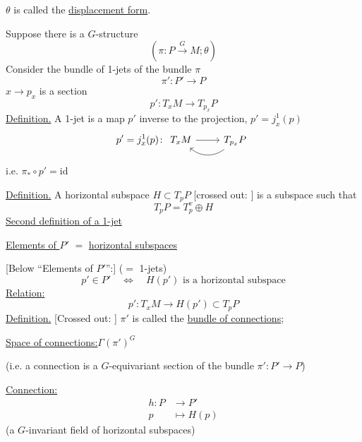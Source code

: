 $\theta$ is called the \underline{displacement form}.

Suppose there is a $G$-structure
\begin{equation*}
(\pi\colon P\overset{G}{\longrightarrow}M;\theta)
\end{equation*}
Consider the bundle of 1-jets of the bundle $\pi$
\begin{equation*}
\pi'\colon P'\to P
\end{equation*}
$x\to p_x$ is a section
\begin{equation*}
p'\colon T_xM\to T_{p_x}P
\end{equation*}
\underline{Definition.} A 1-jet is a map $p'$ inverse to the projection, $p'=j_x^1(p)$
\begin{equation*}
p'=j_x^1(p)\colon
\begin{tikzcd}
T_xM \arrow[r] & T_{p_x}P \arrow[l,bend left=40]
\end{tikzcd}
\end{equation*}
i.e. $\pi_*\circ p'=\mathrm{id}$

\underline{Definition.} A horizontal subspace $H\subset T_pP$
[crossed out: ]
is a subspace such that
\begin{equation*}
T_pP=T_p^v\oplus H
\end{equation*}
\underline{Second definition of a 1-jet}

\underline{Elements of $P'$} $=$ \underline{horizontal subspaces}

[Below ``Elements of $P'$'':] ($=$ 1-jets)
\begin{equation*}
p'\in P'\quad\Longleftrightarrow\quad H(p')\text{ is a horizontal subspace}
\end{equation*}
\underline{Relation:}
\begin{equation*}
p'\colon T_xM\to H(p')\subset T_pP
\end{equation*}
\underline{Definition.} [Crossed out: ]
$\pi'$ is called the \underline{bundle of connections};

\underline{Space of connections:}\quad $\Gamma(\pi')^G$

(i.e. a connection is a $G$-equivariant section of the bundle $\pi'\colon P'\to P$)

\underline{Connection:}
\begin{equation*}
\begin{aligned}
h\colon P&\to P'\\
p&\mapsto H(p)
\end{aligned}
\end{equation*}
(a $G$-invariant field of horizontal subspaces)

